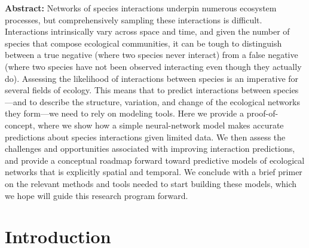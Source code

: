 \documentclass[11pt]{article}
\begin{document}
\vfill
\textbf{\sffamily Abstract: }Networks of species interactions underpin
numerous ecosystem processes, but comprehensively sampling these
interactions is difficult. Interactions intrinsically vary across space
and time, and given the number of species that compose ecological
communities, it can be tough to distinguish between a true negative
(where two species never interact) from a false negative (where two
species have not been observed interacting even though they actually
do). Assessing the likelihood of interactions between species is an
imperative for several fields of ecology. This means that to predict
interactions between species---and to describe the structure, variation,
and change of the ecological networks they form---we need to rely on
modeling tools. Here we provide a proof-of-concept, where we show how a
simple neural-network model makes accurate predictions about species
interactions given limited data. We then assess the challenges and
opportunities associated with improving interaction predictions, and
provide a conceptual roadmap forward toward predictive models of
ecological networks that is explicitly spatial and temporal. We conclude
with a brief primer on the relevant methods and tools needed to start
building these models, which we hope will guide this research program
forward.
\vfill

\clearpage
\linenumbers
\pagestyle{normal}

\hypertarget{introduction}{%
\section{Introduction}\label{introduction}}
\end{document}
